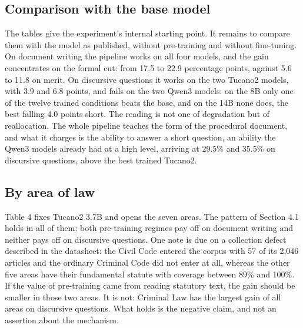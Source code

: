 \documentclass{IOS-Book-Article}
\begin{document}
\subsection{Comparison with the base model}
The tables give the experiment's internal starting point. It remains to compare them with the model as published, without pre-training and without fine-tuning. On document writing the pipeline works on all four models, and the gain concentrates on the formal cut: from 17.5 to 22.9 percentage points, against 5.6 to 11.8 on merit. On discursive questions it works on the two Tucano2 models, with 3.9 and 6.8 points, and fails on the two Qwen3 models: on the 8B only one of the twelve trained conditions beats the base, and on the 14B none does, the best falling 4.0 points short. The reading is not one of degradation but of reallocation. The whole pipeline teaches the form of the procedural document, and what it charges is the ability to answer a short question, an ability the Qwen3 models already had at a high level, arriving at 29.5\% and 35.5\% on discursive questions, above the best trained Tucano2.
\subsection{By area of law}
Table 4 fixes Tucano2 3.7B and opens the seven areas. The pattern of Section 4.1 holds in all of them: both pre-training regimes pay off on document writing and neither pays off on discursive questions. One note is due on a collection defect described in the datasheet: the Civil Code entered the corpus with 57 of its 2,046 articles and the ordinary Criminal Code did not enter at all, whereas the other five areas have their fundamental statute with coverage between 89\% and 100\%. If the value of pre-training came from reading statutory text, the gain should be smaller in those two areas. It is not: Criminal Law has the largest gain of all areas on discursive questions. What holds is the negative claim, and not an assertion about the mechanism.
\end{document}
